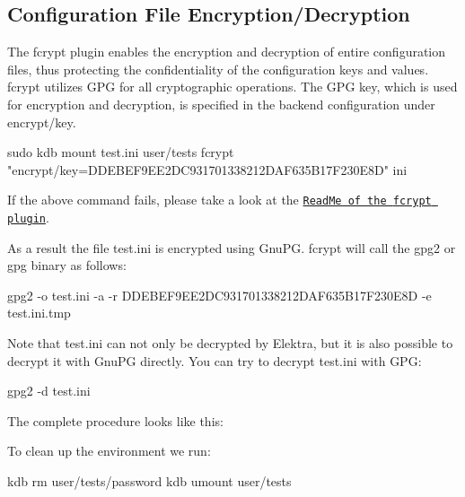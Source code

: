 \subsection*{Configuration File Encryption/\+Decryption}

The {\ttfamily fcrypt} plugin enables the encryption and decryption of entire configuration files, thus protecting the confidentiality of the configuration keys and values. {\ttfamily fcrypt} utilizes G\+PG for all cryptographic operations. The G\+PG key, which is used for encryption and decryption, is specified in the backend configuration under {\ttfamily encrypt/key}.


\begin{DoxyCode}
sudo kdb mount test.ini user/tests fcrypt "encrypt/key=DDEBEF9EE2DC931701338212DAF635B17F230E8D" ini
\end{DoxyCode}


If the above command fails, please take a look at the \href{https://master.libelektra.org/src/plugins/fcrypt/README.md#known-issues}{\tt Read\+Me of the {\ttfamily fcrypt} plugin}.

As a result the file {\ttfamily test.\+ini} is encrypted using Gnu\+PG. {\ttfamily fcrypt} will call the {\ttfamily gpg2} or {\ttfamily gpg} binary as follows\+:


\begin{DoxyCode}
gpg2 -o test.ini -a -r DDEBEF9EE2DC931701338212DAF635B17F230E8D -e test.ini.tmp
\end{DoxyCode}


Note that {\ttfamily test.\+ini} can not only be decrypted by Elektra, but it is also possible to decrypt it with Gnu\+PG directly. You can try to decrypt {\ttfamily test.\+ini} with G\+PG\+:


\begin{DoxyCode}
gpg2 -d test.ini
\end{DoxyCode}


The complete procedure looks like this\+:




To clean up the environment we run\+:


\begin{DoxyCode}
kdb rm user/tests/password
kdb umount user/tests
\end{DoxyCode}


